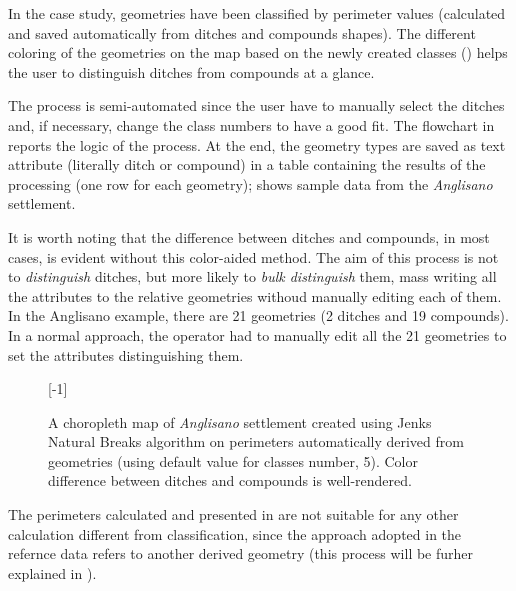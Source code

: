             In the case study, geometries have been classified by perimeter values (calculated and saved automatically from ditches and compounds shapes). The different coloring of the geometries on the map based on the newly created classes () helps the user to distinguish ditches from compounds at a glance.

            The process is semi-automated since the user have to manually select the ditches and, if necessary, change the class numbers to have a good fit. The flowchart in  reports the logic of the process. At the end, the geometry types are saved as text attribute (literally \textsf{ditch} or \textsf{compound}) in a table containing the results of the processing (one row for each geometry);  shows sample data from the \emph{Anglisano} settlement.

            It is worth noting that the difference between ditches and compounds, in most cases, is evident without this color-aided method. The aim of this process is not to \emph{distinguish} ditches, but more likely to \emph{bulk distinguish} them, mass writing all the attributes to the relative geometries withoud manually editing each of them. In the Anglisano example, there are 21 geometries (2 ditches and 19 compounds). In a normal approach, the operator had to manually edit all the 21 geometries to set the attributes distinguishing them.

            \begin{figure}[H]
                \centering
                \scalebox{1}[-1]{ %
                    \begin{tikzpicture}[x=1mm,y=1mm,scale=0.22]
                        
                    \end{tikzpicture}
                }
                \caption[A choropleth map of \emph{Anglisano} settlement using Jenks Natural Breaks]{A choropleth map of \emph{Anglisano} settlement created using Jenks Natural Breaks algorithm on perimeters automatically derived from geometries (using default value for classes number, 5). Color difference between ditches and compounds is well-rendered.}
                \label{fig:jenks-color}
            \end{figure}

            The perimeters calculated and presented in  are not suitable for any other calculation different from classification, since the approach adopted in the refernce data \cite{laterza} refers to another derived geometry (this process will be furher explained in ).

